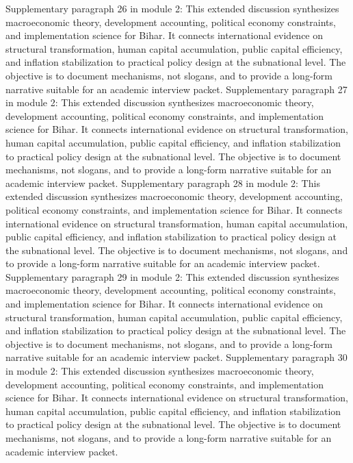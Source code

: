 \documentclass[preprint,12pt]{elsarticle}
\begin{document}
Supplementary paragraph 26 in module 2: This extended discussion synthesizes macroeconomic theory, development accounting, political economy constraints, and implementation science for Bihar. It connects international evidence on structural transformation, human capital accumulation, public capital efficiency, and inflation stabilization to practical policy design at the subnational level. The objective is to document mechanisms, not slogans, and to provide a long-form narrative suitable for an academic interview packet.
Supplementary paragraph 27 in module 2: This extended discussion synthesizes macroeconomic theory, development accounting, political economy constraints, and implementation science for Bihar. It connects international evidence on structural transformation, human capital accumulation, public capital efficiency, and inflation stabilization to practical policy design at the subnational level. The objective is to document mechanisms, not slogans, and to provide a long-form narrative suitable for an academic interview packet.
Supplementary paragraph 28 in module 2: This extended discussion synthesizes macroeconomic theory, development accounting, political economy constraints, and implementation science for Bihar. It connects international evidence on structural transformation, human capital accumulation, public capital efficiency, and inflation stabilization to practical policy design at the subnational level. The objective is to document mechanisms, not slogans, and to provide a long-form narrative suitable for an academic interview packet.
Supplementary paragraph 29 in module 2: This extended discussion synthesizes macroeconomic theory, development accounting, political economy constraints, and implementation science for Bihar. It connects international evidence on structural transformation, human capital accumulation, public capital efficiency, and inflation stabilization to practical policy design at the subnational level. The objective is to document mechanisms, not slogans, and to provide a long-form narrative suitable for an academic interview packet.
Supplementary paragraph 30 in module 2: This extended discussion synthesizes macroeconomic theory, development accounting, political economy constraints, and implementation science for Bihar. It connects international evidence on structural transformation, human capital accumulation, public capital efficiency, and inflation stabilization to practical policy design at the subnational level. The objective is to document mechanisms, not slogans, and to provide a long-form narrative suitable for an academic interview packet.
\end{document}

